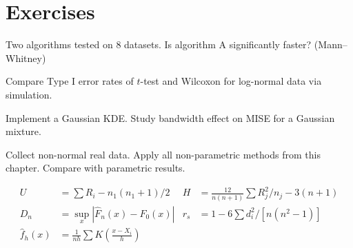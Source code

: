 \section{Exercises}

\begin{exercise}[$\star$]
Two algorithms tested on 8 datasets. Is algorithm A significantly faster? (Mann--Whitney)
\end{exercise}

\begin{exercise}[$\star\star$]
Compare Type I error rates of $t$-test and Wilcoxon for log-normal data via simulation.
\end{exercise}

\begin{exercise}[$\star\star$]
Implement a Gaussian KDE. Study bandwidth effect on MISE for a Gaussian mixture.
\end{exercise}

\begin{exercise}
Collect non-normal real data. Apply all non-parametric methods from this chapter. Compare with parametric results.
\end{exercise}

\begin{keyformulas}
\begin{align*}
U &= \sum R_i - n_1(n_1+1)/2 & H &= \frac{12}{n(n+1)}\sum R_j^2/n_j-3(n+1) \\
D_n &= \sup_x|\hat{F}_n(x)-F_0(x)| & r_s &= 1-6\sum d_i^2/[n(n^2-1)] \\
\hat{f}_h(x) &= \frac{1}{nh}\sum K\!\left(\frac{x-X_i}{h}\right)
\end{align*}
\end{keyformulas}
